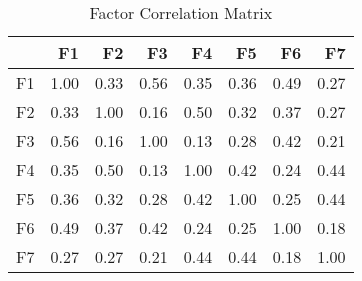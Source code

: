 \begin{table}[ht]
\centering
\caption{Factor Correlation Matrix} 
\label{tab:factor_correlations}
\begin{tabular}{rrrrrrrr}
  \hline
 & F1 & F2 & F3 & F4 & F5 & F6 & F7 \\ 
  \hline
F1 & 1.00 & 0.33 & 0.56 & 0.35 & 0.36 & 0.49 & 0.27 \\ 
  F2 & 0.33 & 1.00 & 0.16 & 0.50 & 0.32 & 0.37 & 0.27 \\ 
  F3 & 0.56 & 0.16 & 1.00 & 0.13 & 0.28 & 0.42 & 0.21 \\ 
  F4 & 0.35 & 0.50 & 0.13 & 1.00 & 0.42 & 0.24 & 0.44 \\ 
  F5 & 0.36 & 0.32 & 0.28 & 0.42 & 1.00 & 0.25 & 0.44 \\ 
  F6 & 0.49 & 0.37 & 0.42 & 0.24 & 0.25 & 1.00 & 0.18 \\ 
  F7 & 0.27 & 0.27 & 0.21 & 0.44 & 0.44 & 0.18 & 1.00 \\ 
   \hline
\end{tabular}
\end{table}
